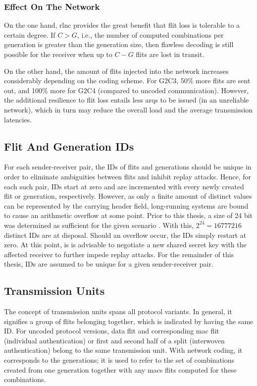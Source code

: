 \subsubsection{Effect On The Network}
On the one hand, \gls{rlnc} provides the great benefit that flit loss is tolerable to a certain degree. If $C > G$, i.e., the number of computed
combinations per generation is greater than the generation size, then flawless decoding is still possible for the receiver when up to $C - G$ flits
are lost in transit.

On the other hand, the amount of flits injected into the network increases considerably depending on the coding scheme. For G2C3, 50\% more flits are
sent out, and 100\% more for G2C4 (compared to uncoded communication). However, the additional resilience to flit loss entails less \glspl{arq} to be
issued (in an unreliable network), which in turn may reduce the overall load and the average transmission latencies.

\subsection{Flit And Generation IDs}
For each sender-receiver pair, the IDs of flits and generations should be unique in order to eliminate ambiguities between flits and inhibit replay
attacks. Hence, for each such pair, IDs start at zero and are incremented with every newly created flit or generation, respectively. However, as only a finite amount of
distinct values can be represented by the carrying header field, long-running systems are bound to cause an arithmetic overflow at some point. Prior
to this thesis, a size of 24 bit was determined as sufficient for the given scenario \cite[5]{franz18authdraft}. With this, $2^{24} = \num{16777216}$
distinct IDs are at disposal. Should an overflow occur, the IDs simply restart at zero. At this point, is is advisable to negotiate a new shared
secret key with the affected receiver to further impede replay attacks. For the remainder of this thesis, IDs are assumed to be unique for a given
sender-receiver pair.

\subsection{Transmission Units}
The concept of transmission units spans all protocol variants. In general, it signifies a group of flits belonging together, which is indicated by
having the same ID. For uncoded protocol versions, data flit and corresponding \gls{mac} flit (individual authentication) or first and second half of a
split (interwoven authentication) belong to the same transmission unit. With network coding, it corresponds to the generations; it is used to refer to
the set of combinations created from one generation together with any \glspl{mac} flits computed for these combinations.

